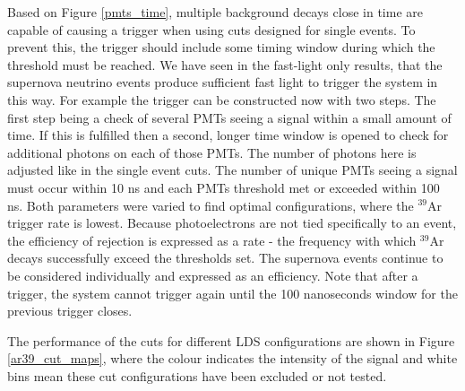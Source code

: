 \documentclass[a4paper]{article}
\begin{document}
Based on Figure \ref{pmts_time}, multiple background decays close in time are capable of causing a trigger when using cuts designed for single events. To prevent this, the trigger should include some timing window during which the threshold must be reached. We have seen in the fast-light only results, that the supernova neutrino events produce sufficient fast light to trigger the system in this way. For example the trigger can be constructed now with two steps. The first step being a check of several PMTs seeing a signal within a small amount of time. If this is fulfilled then a second, longer time window is opened to check for additional photons on each of those PMTs. The number of photons here is adjusted like in the single event cuts. The number of unique PMTs seeing a signal must occur within 10 ns and each PMTs threshold met or exceeded within 100 ns. Both parameters were varied to find optimal configurations, where the $^{39}$Ar trigger rate is lowest. Because photoelectrons are not tied specifically to an event, the efficiency of rejection is expressed as a rate - the frequency with which $^{39}$Ar decays successfully exceed the thresholds set. The supernova events continue to be considered individually and expressed as an efficiency. Note that after a trigger, the system cannot trigger again until the 100 nanoseconds window for the previous trigger closes.

The performance of the cuts for different LDS configurations are shown in Figure \ref{ar39_cut_maps}, where the colour indicates the intensity of the signal and white bins mean these cut configurations have been excluded or not tested.
\end{document}
